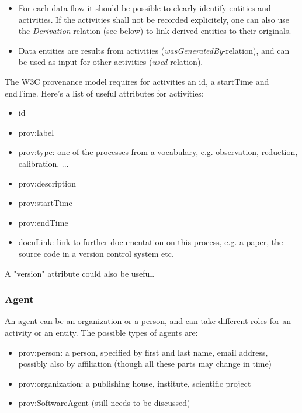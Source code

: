 \documentclass[11pt,a4paper]{ivoa}
\begin{document}
\begin{itemize}
\item For each data flow it should be possible to clearly identify entities and activities. If the activities shall not be recorded explicitely, one can also use the \emph{Derivation}-relation (see below) to link derived entities to their originals.

\item Data entities are results from activities (\emph{wasGeneratedBy}-relation), and can be used as input for other activities (\emph{used}-relation). 

\end{itemize}

The W3C provenance model requires for activities an id, a startTime and endTime. 
Here's a list of useful attributes for activities:

\begin{itemize}
\item id
\item prov:label
\item prov:type: one of the processes from a vocabulary, e.g. observation, reduction, calibration, ... 
\item prov:description
\item prov:startTime
\item prov:endTime
\item docuLink: link to further documentation on this process, e.g. a paper, the source code in a version control system etc.
\end{itemize}

A "version" attribute could also be useful.




\subsubsection{Agent}
An agent can be an organization or a person, and can take different roles for an activity or an entity. The possible types of agents are:
\begin{itemize}
\item prov:person: a person, specified by first and last name, email address, possibly also by affiliation (though all these parts may change in time)
\item prov:organization: a publishing house, institute, scientific project
\item prov:SoftwareAgent (still needs to be discussed)
\end{itemize}
\end{document}
